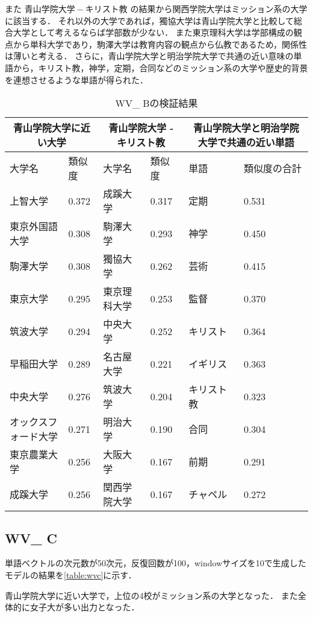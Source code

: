 また $ 青山学院大学 - キリスト教 $ の結果から関西学院大学はミッション系の大学に該当する．
それ以外の大学であれば，獨協大学は青山学院大学と比較して総合大学として考えるならば学部数が少ない．
また東京理科大学は学部構成の観点から単科大学であり，駒澤大学は教育内容の観点から仏教であるため，関係性は薄いと考える．
さらに，青山学院大学と明治学院大学で共通の近い意味の単語から，キリスト教，神学，定期，合同などのミッション系の大学や歴史的背景を連想させるような単語が得られた．

\begin{table}[H]
\caption{WV\_ Bの検証結果}
\centering
\footnotesize
\begin{tabular}{ll|ll|ll}
\hline
\multicolumn{2}{c}{青山学院大学に近い大学} & \multicolumn{2}{c}{青山学院大学 - キリスト教} & \multicolumn{2}{c}{青山学院大学と明治学院大学で共通の近い単語}
\\ \hline
大学名 & 類似度 & 大学名 & 類似度 & 単語 & 類似度の合計
\\ \hline \hline
上智大学 & 0.372 & 成蹊大学 & 0.317 & 定期 & 0.531\\
東京外国語大学 & 0.308 & 駒澤大学 & 0.293 & 神学 & 0.450\\
駒澤大学 & 0.308 & 獨協大学 & 0.262 & 芸術 & 0.415\\
東京大学 & 0.295 & 東京理科大学 & 0.253 & 監督 & 0.370\\
筑波大学 & 0.294 & 中央大学 & 0.252 & キリスト & 0.364\\
早稲田大学 & 0.289 & 名古屋大学 & 0.221 & イギリス & 0.363\\
中央大学 & 0.276 & 筑波大学 & 0.204 & キリスト教 & 0.323\\
オックスフォード大学 & 0.271 & 明治大学 & 0.190 & 合同 & 0.304\\
東京農業大学 & 0.256 & 大阪大学 & 0.167 & 前期 & 0.291\\
成蹊大学 & 0.256 & 関西学院大学 & 0.167 & チャペル & 0.272\\ \hline
\end{tabular}
\label{table:wvb}
\end{table}


\subsection{WV\_ C}
単語ベクトルの次元数が50次元，反復回数が100，windowサイズを10で生成したモデルの結果を\ref{table:wvc}に示す．

青山学院大学に近い大学で，上位の4校がミッション系の大学となった．
また全体的に女子大が多い出力となった．

